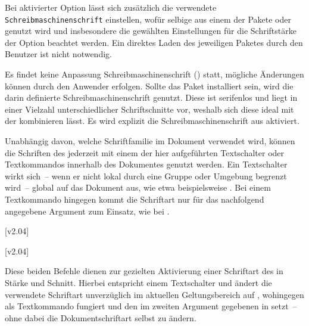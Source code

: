\begin{DeclareEntity*}{}
\begin{DeclareEntity*}{}
\begin{DeclareEntity*}{}
\begin{Declaration}
%
Bei aktivierter Option  lässt sich zusätzlich die verwendete
\texttt{Schreibmaschinenschrift} einstellen, wofür selbige aus einem der Pakete 
 oder  genutzt wird und insbesondere die 
gewählten Einstellungen für die Schriftstärke der Option  
beachtet werden. Ein direktes Laden des jeweiligen Paketes durch den Benutzer 
ist nicht notwendig.
%
\begin{DeclareValues}{}
  Es findet keine Anpassung Schreibmaschinenschrift () statt, 
  mögliche Änderungen können durch den Anwender erfolgen.
  Sollte das Paket  installiert sein, wird die darin 
  definierte Schreibmaschinenschrift genutzt. Diese ist serifenlos und liegt in 
  einer Vielzahl unterschiedlicher Schriftschnitte vor, weshalb sich diese 
  ideal mit der \OpenSans kombinieren lässt.
  Es wird explizit die Schreibmaschinenschrift aus  aktiviert. 
\end{DeclareValues}
\end{Declaration}



Unabhängig davon, welche Schriftfamilie im Dokument verwendet wird, können die 
Schriften des \CDs jederzeit mit einem der hier aufgeführten Textschalter oder 
Textkommandos innerhalb des Dokumentes genutzt werden. Ein Textschalter wirkt 
sich~-- wenn er nicht lokal durch eine Gruppe oder Umgebung begrenzt wird~-- 
global auf das Dokument aus, wie etwa beispielsweise . Bei 
einem Textkommando hingegen kommt die Schriftart nur für das nachfolgend 
angegebene Argument zum Einsatz, wie bei . 
%
\begin{Declaration}
  {}
  [v2.04]
\begin{Declaration}
  {}
  [v2.04]
\printdeclarationlist

Diese beiden Befehle dienen zur gezielten Aktivierung einer Schriftart des \CDs 
in Stärke und Schnitt. Hierbei entspricht  einem Textschalter und 
ändert die verwendete Schriftart unverzüglich im aktuellen Geltungsbereich auf 
, wohingegen  als Textkommando fungiert und den 
im zweiten Argument gegebenen  in  setzt~-- ohne 
dabei die Dokumentschriftart selbst zu ändern.


\end{Declaration}
\end{Declaration}
\end{DeclareEntity*}
\end{DeclareEntity*}
\end{DeclareEntity*}
